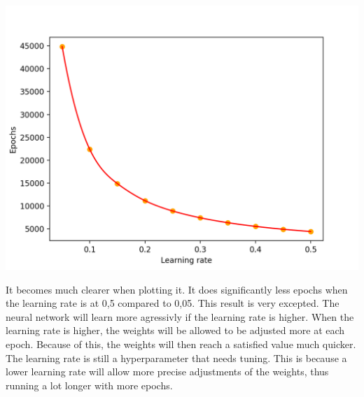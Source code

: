\documentclass[titlepage, 11pt]{article}
\begin{document}
    \begin{center}
        \includegraphics[]{Task1.png}
    \end{center}
    It becomes much clearer when plotting it. It does significantly less epochs when the learning rate is at 0,5 compared to 0,05. This result is very excepted. The neural network will learn more agressivly if the learning rate is higher. When the learning rate is higher, the weights will be allowed to be adjusted more at each epoch. Because of this, the weights will then reach a satisfied value much quicker. The learning rate is still a hyperparameter that needs tuning. This is because a lower learning rate will allow more precise adjustments of the weights, thus running a lot longer with more epochs. 
\end{document}
